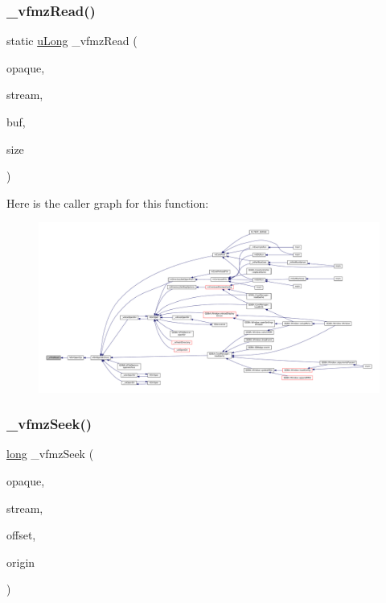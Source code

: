 \subsubsection{\texorpdfstring{\+\_\+vfmz\+Read()}{\_vfmzRead()}}
{\footnotesize\ttfamily static \mbox{\hyperlink{ioapi_8h_a50e9e9d5c30e481de822ad68fe537986}{u\+Long}} \+\_\+vfmz\+Read (\begin{DoxyParamCaption}\item[{\mbox{\hyperlink{ioapi_8h_a39ab6d73c1cd44bc17064c2dcbb3e753}{voidpf}}}]{opaque,  }\item[{\mbox{\hyperlink{ioapi_8h_a39ab6d73c1cd44bc17064c2dcbb3e753}{voidpf}}}]{stream,  }\item[{void $\ast$}]{buf,  }\item[{\mbox{\hyperlink{ioapi_8h_a50e9e9d5c30e481de822ad68fe537986}{u\+Long}}}]{size }\end{DoxyParamCaption})\hspace{0.3cm}{\ttfamily [static]}}

Here is the caller graph for this function\+:
\nopagebreak
\begin{figure}[H]
\begin{center}
\leavevmode
\includegraphics[width=350pt]{vfs-zip_8c_a3521a7ab612e84b95da1cf213cb061ee_icgraph}
\end{center}
\end{figure}
\mbox{\label{vfs-zip_8c_a501af3b5e66d0e32bbde898125aa721d}} 
\subsubsection{\texorpdfstring{\+\_\+vfmz\+Seek()}{\_vfmzSeek()}}
{\footnotesize\ttfamily \mbox{\hyperlink{ioapi_8h_a3c7b35ad9dab18b8310343c201f7b27e}{long}} \+\_\+vfmz\+Seek (\begin{DoxyParamCaption}\item[{\mbox{\hyperlink{ioapi_8h_a39ab6d73c1cd44bc17064c2dcbb3e753}{voidpf}}}]{opaque,  }\item[{\mbox{\hyperlink{ioapi_8h_a39ab6d73c1cd44bc17064c2dcbb3e753}{voidpf}}}]{stream,  }\item[{\mbox{\hyperlink{ioapi_8h_a50e9e9d5c30e481de822ad68fe537986}{u\+Long}}}]{offset,  }\item[{\mbox{\hyperlink{ioapi_8h_a787fa3cf048117ba7123753c1e74fcd6}{int}}}]{origin }\end{DoxyParamCaption})}

